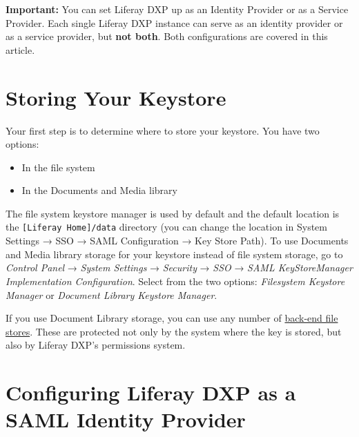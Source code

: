 \noindent\hrulefill

\textbf{Important:} You can set Liferay DXP up as an Identity Provider
or as a Service Provider. Each single Liferay DXP instance can serve as
an identity provider or as a service provider, but \textbf{not both}.
Both configurations are covered in this article.

\noindent\hrulefill

\section{Storing Your Keystore}\label{storing-your-keystore}

Your first step is to determine where to store your keystore. You have
two options:

\begin{itemize}
\tightlist
\item
  In the file system
\item
  In the Documents and Media library
\end{itemize}

The file system keystore manager is used by default and the default
location is the \texttt{{[}Liferay\ Home{]}/data} directory (you can
change the location in System Settings → SSO → SAML Configuration → Key
Store Path). To use Documents and Media library storage for your
keystore instead of file system storage, go to \emph{Control Panel} →
\emph{System Settings} → \emph{Security} → \emph{SSO} → \emph{SAML
KeyStoreManager Implementation Configuration}. Select from the two
options: \emph{Filesystem Keystore Manager} or \emph{Document Library
Keystore Manager}.

If you use Document Library storage, you can use any number of
\href{/docs/7-2/deploy/-/knowledge_base/d/document-repository-configuration}{back-end
file stores}. These are protected not only by the system where the key
is stored, but also by Liferay DXP's permissions system.

\section{Configuring Liferay DXP as a SAML Identity
Provider}\label{configuring-liferay-dxp-as-a-saml-identity-provider}

